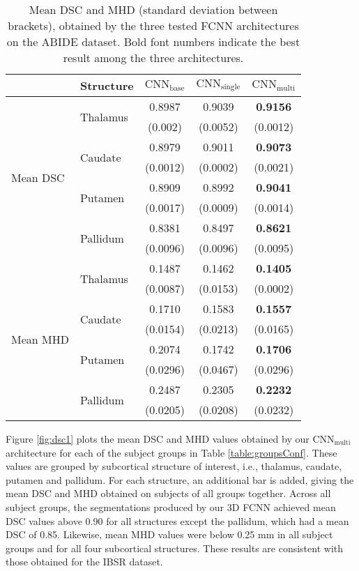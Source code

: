 \documentclass[twoside,fleqn,espcrc2]{elsarticle}
\newcommand{\CNNbase}{\mr{CNN}_\mr{base}}
\newcommand{\CNNsingle}{\mr{CNN}_\mr{single}}
\newcommand{\CNNmulti}{\mr{CNN}_\mr{multi}}
\newcommand{\mr}[1]{\mathrm{#1}}
\begin{document}
\begin{table}[h!]
\begin{center}
\begin{footnotesize}
\renewcommand{\arraystretch}{1.2}
\begin{tabular}{llccc}
\toprule
    & \textbf{Structure} & $\bm{\CNNbase}$ & $\bm{\CNNsingle}$ & $\bm{\CNNmulti}$  \\
    \midrule
\multirow{8}{*}{Mean DSC} & \multirow{2}{*}{Thalamus} & 0.8987 & 0.9039 & \textbf{0.9156} \\
&  & (0.002) & (0.0052) & (0.0012) \\
\cmidrule{2-5}
& \multirow{2}{*}{Caudate} & 0.8979 & 0.9011 & \textbf{0.9073} \\
&  & (0.0012) & (0.0002) & (0.0021)\\
\cmidrule{2-5}
& \multirow{2}{*}{Putamen} & 0.8909 & 0.8992 & \textbf{0.9041} \\
&  & (0.0017) & (0.0009) & (0.0014) \\
\cmidrule{2-5}
& \multirow{2}{*}{Pallidum} & 0.8381 & 0.8497 & \textbf{0.8621} \\
&  & (0.0096) & (0.0096) & (0.0095) \\
\midrule
\multirow{8}{*}{Mean MHD} & \multirow{2}{*}{Thalamus} & 0.1487 & 0.1462 & \textbf{0.1405} \\
&  & (0.0087) & (0.0153) & (0.0002) \\
\cmidrule{2-5}
& \multirow{2}{*}{Caudate} & 0.1710 & 0.1583 & \textbf{0.1557} \\
&  & (0.0154) & (0.0213) & (0.0165) \\
\cmidrule{2-5}
& \multirow{2}{*}{Putamen} & 0.2074 & 0.1742 & \textbf{0.1706} \\
&  & (0.0296) & (0.0467) & (0.0296) \\
\cmidrule{2-5}
& \multirow{2}{*}{Pallidum} & 0.2487 & 0.2305 & \textbf{0.2232} \\
&  & (0.0205) & (0.0208) & (0.0232) \\
\bottomrule
\end{tabular}
\end{footnotesize}
\caption{Mean DSC and MHD (standard deviation between brackets), obtained by the three tested FCNN architectures on the ABIDE dataset. Bold font numbers indicate the best result among the three architectures.}
\label{table:ABIDEThreeConf}
\end{center}
\end{table}


Figure \ref{fig:dsc1} plots the mean DSC and MHD values obtained by our $\CNNmulti$ architecture for each of the subject groups in Table \ref{table:groupsConf}. These values are grouped by subcortical structure of interest, i.e., thalamus, caudate, putamen and pallidum. For each structure, an additional bar is added, giving the mean DSC and MHD obtained on subjects of all groups together. Across all subject groups, the segmentations produced by our 3D FCNN achieved mean DSC values above 0.90 for all structures except the pallidum, which had a mean DSC of 0.85. Likewise, mean MHD values were below 0.25 mm in all subject groups and for all four subcortical structures. These results are consistent with those obtained for the IBSR dataset.
\end{document}
